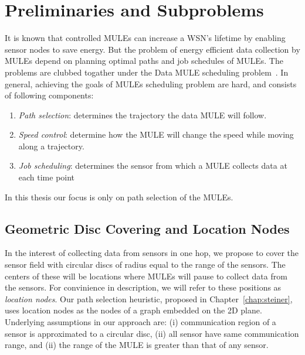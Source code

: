 \chapter{Preliminaries and Subproblems}
\label{chap:location_nodes}


It is known that controlled MULEs can increase a WSN's lifetime by enabling sensor nodes to save energy. But the problem of energy efficient data collection by MULEs depend on planning optimal paths and job schedules of MULEs. The problems are clubbed togather under the Data MULE scheduling problem~\cite{dms}. In general, achieving the goals of MULEs scheduling problem are 
hard, and consists of following components: 
\begin{enumerate}
  \item {\em Path selection}: determines the trajectory the data MULE 
    will follow.
\item {\em Speed control}: determine how the MULE will change the speed
  while moving along a trajectory. 
\item {\em Job scheduling}: determines the sensor from which a MULE collects data at each time point
\end{enumerate}
In this thesis our focus is only on path selection of the MULEs.

\section{Geometric Disc Covering and Location Nodes}

In the interest of collecting data from sensors in one hop, we propose to cover the sensor field with circular discs of radius equal to the range of the sensors. The centers of these will be locations where MULEs will pause to collect data from the sensors. For convinience in description, we will refer to these positions as \emph{location nodes}. Our path selection heuristic, proposed in Chapter~\ref{chap:steiner}, uses location nodes as the nodes of a graph embedded on the 2D plane. Underlying assumptions in our approach are: (i) communication region of a sensor is approximated to a circular disc, (ii) all sensor have same communication range, and (ii) the range of the MULE is greater than that of any sensor. %

